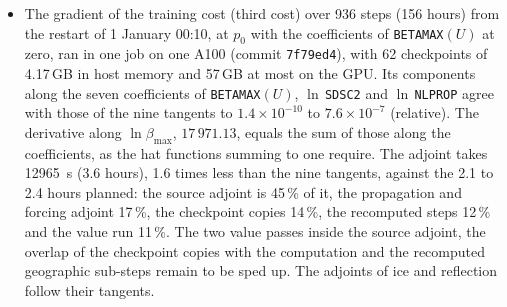 \documentclass[11pt,a4paper]{article}
\begin{document}
\begin{itemize}
multiprocessor, 115\,KB of shared memory): 71\,s per step at the start
of the run, against 12.3\,s for the tangent, which would put a 156-hour
gradient at about 6 to 22 hours instead of the planned 2.1 to 2.4.
After optimisation (commit \texttt{3e4a91a}) it costs 3.3 times its
value kernel. Three changes did this: 50\,KB of shared memory with a
bound of 168 registers, so 3 nodes fit per multiprocessor; the tape and
the per-bin arrays moved to a scratch in global memory; and, above all,
a transposed saturation table for W3SDS4, whose scan of the whole table
for each bin made half the cost. The dot products are unchanged to the
bit. Six steps of grid v5 $K=4$ through the two-level driver take
\SI{250}{s} instead of \SI{501}{s}, and the 156-hour gradient is
estimated at 5 to 7 hours on one A100 with 320\,GB of host memory.
\item The gradient of the training cost (third cost) over 936 steps
(156 hours) from the restart of 1 January 00:10, at $p_0$ with the
coefficients of \texttt{BETAMAX}$(U)$ at zero, ran in one job on one
A100 (commit \texttt{7f79ed4}), with 62 checkpoints of 4.17\,GB in host
memory and 57\,GB at most on the GPU. Its components along the seven
coefficients of \texttt{BETAMAX}$(U)$, $\ln$\,\texttt{SDSC2} and
$\ln$\,\texttt{NLPROP} agree with those of the nine tangents to
$1.4\times10^{-10}$ to $7.6\times10^{-7}$ (relative). The derivative
along $\ln\beta_{\max}$, $17\,971.13$, equals the sum of those along the
coefficients, as the hat functions summing to one require. The adjoint
takes \SI{12965}{s} (3.6 hours), 1.6 times less than the nine tangents,
against the 2.1 to 2.4 hours planned: the source adjoint is 45\,\% of
it, the propagation and forcing adjoint 17\,\%, the checkpoint copies
14\,\%, the recomputed steps 12\,\% and the value run 11\,\%. The two
value passes inside the source adjoint, the overlap of the checkpoint
copies with the computation and the recomputed geographic sub-steps
remain to be sped up. The adjoints of ice and reflection follow their
tangents.
\end{itemize}
\end{document}
